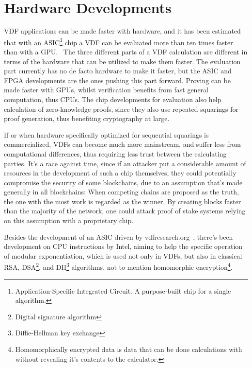 \section{Hardware Developments}
VDF applications can be made faster with hardware, and it has been estimated that with an ASIC\footnote{Application-Specific Integrated Circuit. A purpose-built chip for a single algorithm.} chip a VDF can be evaluated more than ten times faster than with a GPU.~\cite{Stanford_Video2020-ap}
The three different parts of a VDF calculation are different in terms of the hardware that can be utilized to make them faster. The evaluation part currently has no de facto hardware to make it faster, but the ASIC and FPGA developments are the ones pushing this part forward. Proving can be made faster with GPUs, whilst verification benefits from fast general computation, thus CPUs.\cite{Protocol_Labs_Kelly_Olson2020-au} The chip developments for evaluation also help calculation of zero-knowledge proofs, since they also use repeated squarings for proof generation, thus benefiting cryptography at large.

If or when hardware specifically optimized for sequential squarings is commercialized, VDFs can become much more mainstream, and suffer less from computational differences, thus requiring less trust between the calculating parties. It's a race against time, since if an attacker put a considerable amount of resources in the development of such a chip themselves, they could potentially compromise the security of some blockchains, due to an assumption that's made generally in all blockchains: When competing chains are proposed as the truth, the one with the most work is regarded as the winner. By creating blocks faster than the majority of the network, one could attack proof of stake systems relying on this assumption with a proprietary chip.

Besides the development of an ASIC driven by vdfresearch.org~\cite{noauthor_undated-hk}, there's been development on CPU instructions by Intel, aiming to help the specific operation of modular exponentiation, which is used not only in VDFs, but also in classical RSA, DSA\footnote{Digital signature algorithm}, and DH\footnote{Diffie-Hellman key exchange} algorithms, not to mention homomorphic encryption\footnote{Homomorphically encrypted data is data that can be done calculations with without revealing it's contents to the calculator.}.~\cite{Drucker2019-cx} 
